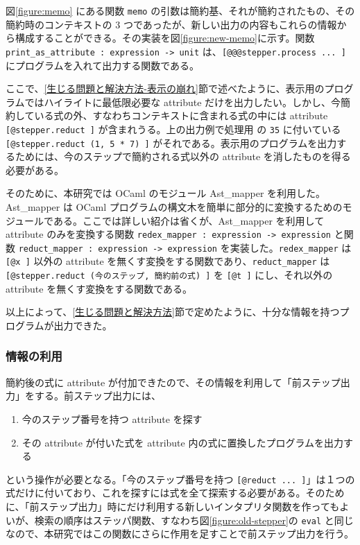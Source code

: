 図\ref{figure:memo} にある関数 \texttt{memo} の引数は簡約基、それが簡約されたもの、その簡約時のコンテキストの 3 つであったが、新しい出力の内容もこれらの情報から構成することができる。その実装を図\ref{figure:new-memo}に示す。関数 \texttt{print\_as\_attribute : expression -> unit} は、\texttt{[@@@stepper.process ... ]} にプログラムを入れて出力する関数である。

ここで、\ref{生じる問題と解決方法-表示の崩れ}節で述べたように、表示用のプログラムではハイライトに最低限必要な attribute だけを出力したい。しかし、今簡約している式の外、すなわちコンテキストに含まれる式の中には attribute \texttt{[@stepper.reduct ]} が含まれうる。上の出力例で処理用
の \texttt{35} に付いている \texttt{[@stepper.reduct (1, 5 * 7) ]} がそれである。表示用のプログラムを出力するためには、今のステップで簡約される式以外の attribute を消したものを得る必要がある。

そのために、本研究では OCaml のモジュール Ast\_mapper を利用した。Ast\_mapper は OCaml プログラムの構文木を簡単に部分的に変換するためのモジュールである。ここでは詳しい紹介は省くが、Ast\_mapper を利用して attribute のみを変換する関数 \texttt{redex\_mapper : expression -> expression} と関数 \texttt{reduct\_mapper : expression -> expression} を実装した。\texttt{redex\_mapper} は \texttt{[@x ]} 以外の attribute を無くす変換をする関数であり、\texttt{reduct\_mapper} は \texttt{[@stepper.reduct (今のステップ, 簡約前の式) ]} を \texttt{[@t ]} にし、それ以外の attribute を無くす変換をする関数である。

以上によって、\ref{生じる問題と解決方法}節で定めたように、十分な情報を持つプログラムが出力できた。

\subsubsection{情報の利用}
簡約後の式に attribute が付加できたので、その情報を利用して「前ステップ出力」をする。前ステップ出力には、
\begin{enumerate}
\item 今のステップ番号を持つ attribute を探す
\item その attribute が付いた式を attribute 内の式に置換したプログラムを出力する
\end{enumerate}
という操作が必要となる。「今のステップ番号を持つ \texttt{[@reduct ... ]}」は１つの式だけに付いており、これを探すには式を全て探索する必要がある。そのために、「前ステップ出力」時にだけ利用する新しいインタプリタ関数を作ってもよいが、検索の順序はステッパ関数、すなわち図\ref{figure:old-stepper}の \texttt{eval} と同じなので、本研究ではこの関数にさらに作用を足すことで前ステップ出力を行う。

